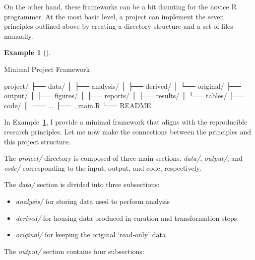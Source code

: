\documentclass[
  letterpaper,
  DIV=11,
  numbers=noendperiod]{scrreport}
\newenvironment{Shaded}{\begin{snugshade}}{\end{snugshade}}
\newcommand{\ExtensionTok}[1]{\textcolor[rgb]{0.00,0.00,0.00}{#1}}
\newcommand{\NormalTok}[1]{\textcolor[rgb]{0.00,0.00,0.00}{#1}}
\providecommand{\tightlist}{%
  \setlength{\itemsep}{0pt}\setlength{\parskip}{0pt}}\usepackage{longtable,booktabs,array}
\theoremstyle{definition}
\newtheorem{example}{Example}[chapter]
\theoremstyle{remark}
\begin{document}
On the other hand, these frameworks can be a bit daunting for the novice
R programmer. At the most basic level, a project can implement the seven
principles outlined above by creating a directory structure and a set of
files manually.

\begin{example}[]\protect\hypertarget{exm-fr-basic-project}{}\label{exm-fr-basic-project}

Minimal Project Framework

\begin{Shaded}
\begin{Highlighting}[]
\ExtensionTok{project/}
\ExtensionTok{├──}\NormalTok{ data/}
\ExtensionTok{│}\NormalTok{   ├── analysis/}
\ExtensionTok{│}\NormalTok{   ├── derived/}
\ExtensionTok{│}\NormalTok{   └── original/}
\ExtensionTok{├──}\NormalTok{ output/}
\ExtensionTok{│}\NormalTok{   ├── figures/}
\ExtensionTok{│}\NormalTok{   ├── reports/}
\ExtensionTok{│}\NormalTok{   ├── results/}
\ExtensionTok{│}\NormalTok{   └── tables/}
\ExtensionTok{├──}\NormalTok{ code/}
\ExtensionTok{│}\NormalTok{   └── ...}
\ExtensionTok{├──}\NormalTok{ \_main.R}
\ExtensionTok{└──}\NormalTok{ README}
\end{Highlighting}
\end{Shaded}

\end{example}

In Example~\ref{exm-fr-basic-project}, I provide a minimal framework
that aligns with the reproducible research principles. Let me now make
the connections between the principles and this project structure.

The \emph{project/} directory is composed of three main sections:
\emph{data/}, \emph{output/}, and \emph{code/} corresponding to the
input, output, and code, respectively.

The \emph{data/} section is divided into three subsections:

\begin{itemize}
\tightlist
\item
  \emph{analysis/} for storing data used to perform analysis
\item
  \emph{derived/} for housing data produced in curation and
  transformation steps
\item
  \emph{original/} for keeping the original `read-only' data
\end{itemize}

The \emph{output/} section contains four subsections:
\end{document}
